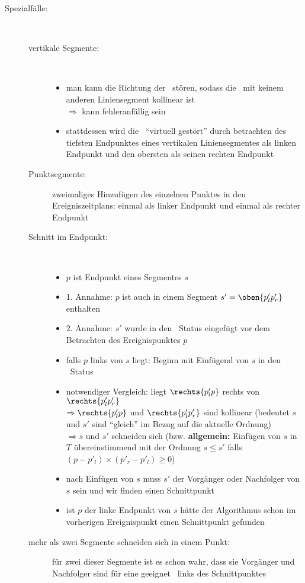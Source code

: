 \begin{description}
	\item[Spezialfälle:] \ \\\up
		\begin{description}
			\item[vertikale Segmente:] \ \\\up
				\begin{itemize}
					\item man kann die Richtung der \sweep~stören, sodass die \sweep~mit keinem anderen Liniensegment kollinear ist\\
						$\Rightarrow$ kann fehleranfällig sein
					\item stattdessen wird die \sweep~``virtuell gestört'' durch betrachten des tiefsten Endpunktes eines vertikalen Liniensegmentes als linken Endpunkt und den obersten als seinen rechten Endpunkt
				\end{itemize}
			\item[Punktsegmente:] zweimaliges Hinzufügen des einzelnen Punktes in den Ereigniszeitplans: einmal als linker Endpunkt und einmal als rechter Endpunkt
			\item[Schnitt im Endpunkt:] \ \\\up
				\begin{itemize}
					\item $p$ ist Endpunkt eines Segmentes $s$
					\item 1. Annahme: $p$ ist auch in einem Segment $s' = \oben{p'_lp'_r}$ enthalten
					\item 2. Annahme: $s'$ wurde in den \sweep~Status eingefügt vor dem Betrachten des Ereignispunktes $p$
					\item falls $p$ links von $s$ liegt: Beginn mit Einfügend von $s$ in den \sweep~Status
					\item notwendiger Vergleich: liegt $\rechts{p'_lp}$ rechts von $\rechts{p'_lp'_r}$\\
					$\Rightarrow \rechts{p'_lp}$ und $\rechts{p'_lp'_r}$ sind kollinear (bedeutet $s$ und $s'$ sind ``gleich'' im Bezug auf die aktuelle Ordnung)\\
					$\Rightarrow s$ und $s'$ schneiden sich (bzw. \textbf{allgemein:} Einfügen von $s$ in $T$ übereinstimmend mit der Ordnung $s \leq s'$ falls $(p-p'_l)\times (p'_r - p'_l)\geq 0$)
					\item nach Einfügen von $s$ muss $s'$ der Vorgänger oder Nachfolger von $s$ sein und wir finden einen Schnittpunkt
					\item ist $p$ der linke Endpunkt von $s$ hätte der Algorithmus schon im vorherigen Ereignispunkt einen Schnittpunkt gefunden
				\end{itemize}
			\item[mehr als zwei Segmente schneiden sich in einem Punkt:] für zwei dieser Segmente ist es schon wahr, dass sie Vorgänger und Nachfolger sind für eine geeignet \sweep~links des Schnittpunktes
		\end{description}
\end{description}
\topbreak
\up\up